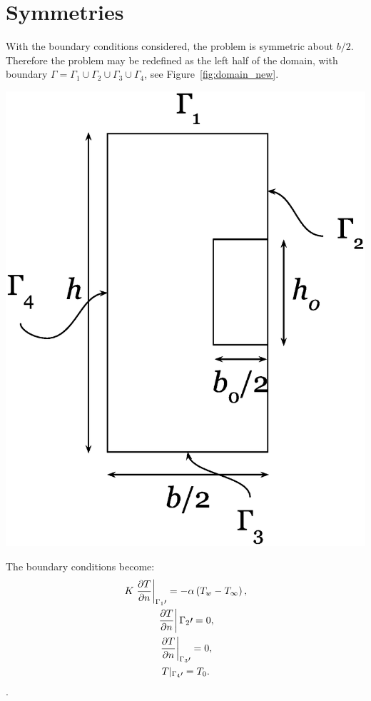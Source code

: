 \section{Symmetries}
With the boundary conditions considered, the problem is symmetric about $b/2$. Therefore the problem may be redefined as the left half of the domain, with boundary $\Gamma=\Gamma_1\cup\Gamma_2\cup\Gamma_3\cup\Gamma_4$, see Figure~\ref{fig:domain_new}. \begin{Figure}
 \centerfloat
 \includegraphics[width=0.7\linewidth]{domain_new.eps}
 \label{fig:domain_new}
\end{Figure} The boundary conditions become:
\begin{equation}
\begin{gathered}
    K\left.\frac{\partial T}{\partial n}\right|_{\Gamma_1\prime} = -\alpha \left(T_w - T_{\infty}\right),\\
    \left.\frac{\partial T}{\partial n}\right|{\Gamma_2\prime} = 0,\\
    \left.\frac{\partial T}{\partial n}\right|_{\Gamma_3\prime} = 0,\\
    T\arrowvert_{\Gamma_4\prime} = T_0.
\end{gathered}\label{eq:bc}
\end{equation}.


